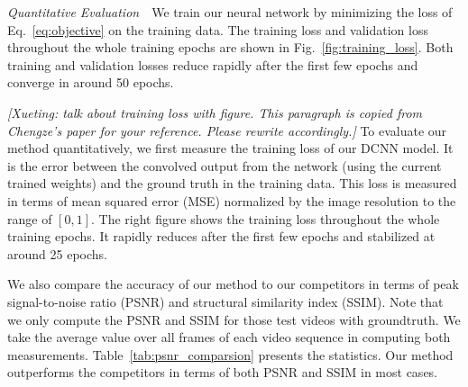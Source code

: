 \vspace{0.15in}
\noindent\emph{Quantitative Evaluation}\,\,\,\,
We train our neural network by minimizing the loss of Eq.~\ref{eq:objective} on
the training data. The training loss and validation loss throughout the whole
training epochs are shown in Fig.~\ref{fig:training_loss}. Both training and
validation losses reduce rapidly after the first few epochs and converge in
around 50 epochs.

{\color{red} {\em [Xueting: talk about training loss with figure. This paragraph is copied from Chengze's paper for your reference. Please rewrite accordingly.]} To evaluate our method quantitatively, we first measure the training
loss of our DCNN model. It is the error between the convolved output from the network
(using the current trained weights) and the ground truth in the training data.
This loss is measured in terms of mean squared error (MSE)
normalized by the image resolution to the range of $[0, 1]$.
The right figure shows the training loss throughout the whole training epochs.
It rapidly reduces after the first few epochs and stabilized at around 25 epochs.}
\fi

We also compare the accuracy of our method to our competitors in terms of peak
signal-to-noise ratio (PSNR) and structural similarity index (SSIM). Note that
we only compute the PSNR and SSIM for those test videos with groundtruth. We
take the average value over all frames of each video sequence in computing both
measurements. Table~\ref{tab:psnr_comparsion} presents the statistics. Our
method outperforms the competitors in terms of both PSNR
and SSIM in most cases.

